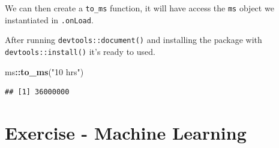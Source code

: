 \documentclass[
]{krantz}
\makeatletter
\newenvironment{Shaded}{\begin{snugshade}}{\end{snugshade}}
\newcommand{\CommentTok}[1]{\textcolor[rgb]{0.37,0.37,0.37}{\textit{#1}}}
\newcommand{\ControlFlowTok}[1]{\textcolor[rgb]{0.27,0.27,0.27}{\textbf{#1}}}
\newcommand{\DataTypeTok}[1]{\textcolor[rgb]{0.27,0.27,0.27}{#1}}
\newcommand{\KeywordTok}[1]{\textcolor[rgb]{0.27,0.27,0.27}{\textbf{#1}}}
\newcommand{\NormalTok}[1]{#1}
\newcommand{\OperatorTok}[1]{\textcolor[rgb]{0.43,0.43,0.43}{\textbf{#1}}}
\newcommand{\OtherTok}[1]{\textcolor[rgb]{0.37,0.37,0.37}{#1}}
\newcommand{\StringTok}[1]{\textcolor[rgb]{0.5,0.5,0.5}{#1}}
\newenvironment{kframe}{%
\medskip{}
\setlength{\fboxsep}{.8em}
 \def\at@end@of@kframe{}%
 \ifinner\ifhmode%
  \def\at@end@of@kframe{\end{minipage}}%
  \begin{minipage}{\columnwidth}%
 \fi\fi%
 \def\FrameCommand##1{\hskip\@totalleftmargin \hskip-\fboxsep
 \colorbox{shadecolor}{##1}\hskip-\fboxsep
     \hskip-\linewidth \hskip-\@totalleftmargin \hskip\columnwidth}%
 \MakeFramed {\advance\hsize-\width
   \@totalleftmargin\z@ \linewidth\hsize
   \@setminipage}}%
 {\par\unskip\endMakeFramed%
 \at@end@of@kframe}
\renewenvironment{Shaded}{\begin{kframe}}{\end{kframe}}
\makeatother
\begin{document}
\begin{Shaded}
\end{Shaded}

We can then create a \texttt{to\_ms} function, it will have access the \texttt{ms} object we instantiated in \texttt{.onLoad}.

\begin{Shaded}
\end{Shaded}

After running \texttt{devtools::document()} and installing the package with \texttt{devtools::install()} it's ready to used.

\begin{Shaded}
\begin{Highlighting}[]
\NormalTok{ms}\OperatorTok{::}\KeywordTok{to\_ms}\NormalTok{(}\StringTok{"10 hrs"}\NormalTok{)}
\end{Highlighting}
\end{Shaded}

\begin{verbatim}
## [1] 36000000
\end{verbatim}

\hypertarget{v8-ml}{%
\chapter{Exercise - Machine Learning}\label{v8-ml}}
\end{document}
